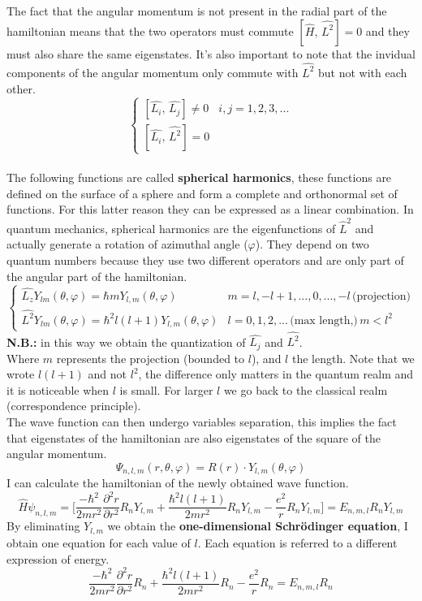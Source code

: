 The fact that the angular momentum is not present in the radial part of the hamiltonian means that the two operators must commute $[\hat{H},\,\hat{L^2}]=0$ and they must also share the same eigenstates. It's also important to note that the invidual components of the angular momentum only commute with $\hat{L^2}$ but not with each other.\\
\[
\begin{cases}
[\hat{L_i},\,\hat{L_j}]\neq0 & i,j=1, 2, 3, ...\\
[\hat{L_i},\,\hat{L^2}]=0
\end{cases}
\]
\\
The following functions are called \textbf{spherical harmonics}, these functions are defined on the surface of a sphere and form a complete and orthonormal set of functions. For this latter reason they can be expressed as a linear combination. In quantum mechanics, spherical harmonics are the eigenfunctions of $\hat{L}^2$ and actually generate a rotation of azimuthal angle ($\varphi$). They depend on two quantum numbers because they use two different operators and are only part of the angular part of the hamiltonian.\\
\[
\begin{cases}
\hat{L_z}Y_{lm}(\theta,\varphi)=\hbar mY_{l,m}(\theta,\varphi) & m = l, -l+1,..., 0,..., -l \,\text{(projection)}\\
\hat{L^2}Y_{lm}(\theta,\varphi)=\hbar^2 l(l+1)Y_{l,m}(\theta,\varphi) & l = 0, 1, 2, ... \,\text{(max length,)}\, m < l^2
\end{cases}
\]
\textbf{N.B.:} in this way we obtain the quantization of $\hat{L_j}$ and $\hat{L^2}$.\\
Where $m$ represents the projection (bounded to $l$), and $l$ the length. Note that we wrote $l(l+1)$ and not $l^2$, the difference only matters in the quantum realm and it is noticeable when $l$ is small. For larger $l$ we go back to the classical realm (correspondence principle).\\
The wave function can then undergo variables separation, this implies the fact that eigenstates of the hamiltonian are also eigenstates of the square of the angular momentum.
\[
\Psi_{n,l,m}(r,\theta,\varphi)=R(r)\cdot Y_{l,m}(\theta,\varphi)
\]
I can calculate the hamiltonian of the newly obtained wave function.
\[
\hat{H}\psi_{n,l,m}=\bigg[\frac{-\hbar^2}{2mr^2}\frac{\partial^2r}{\partial r^2}R_nY_{l,m}+\frac{\hbar^2l(l+1)}{2mr^2}R_nY_{l,m}-\frac{e^2}{r}R_nY_{l,m}\bigg]=E_{n,m,l}R_nY_{l,m}
\]
By eliminating $Y_{l,m}$ we obtain the \textbf{one-dimensional Schr\"odinger equation}, I obtain one equation for each value of $l$. Each equation is referred to a different expression of energy.
\[
\frac{-\hbar^2}{2mr^2}\frac{\partial^2r}{\partial r^2}R_n+\frac{\hbar^2l(l+1)}{2mr^2}R_n-\frac{e^2}{r}R_n=E_{n,m,l}R_n
\]
\\


